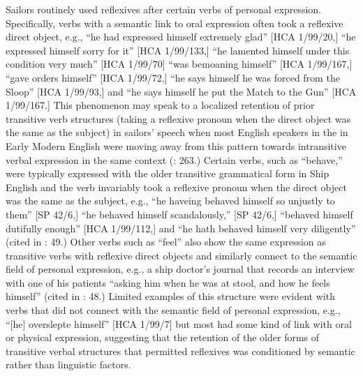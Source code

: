   Sailors routinely used reflexives after certain verbs of personal expression. Specifically, verbs with a semantic link to oral expression often took a reflexive direct object, e.g., “he had expressed himself extremely glad” [HCA 1/99/20,] “he expressed himself sorry for it” [HCA 1/99/133,] “he lamented himself under this condition very much” [HCA 1/99/70] “was bemoaning himself” [HCA 1/99/167,] “gave orders himself” [HCA 1/99/72,] “he says himself he was forced from the Sloop” [HCA 1/99/93,] and “he says himself he put the Match to the Gun” [HCA 1/99/167.] This phenomenon may speak to a localized retention of prior transitive verb structures (taking a reflexive pronoun when the direct object was the same as the subject) in sailors’ speech when most English speakers in the in Early Modern English were moving away from this pattern towards intransitive verbal expression in the same context (\citealt{MillwardHayes2012}: 263.) Certain verbs, such as “behave,” were typically expressed with the older transitive grammatical form in Ship English and the verb invariably took a reflexive pronoun when the direct object was the same as the subject, e.g., “he haveing behaved himself so unjustly to them” [SP 42/6,] “he behaved himself scandalously,” [SP 42/6,] “behaved himself dutifully enough” [HCA 1/99/112,] and “he hath behaved himself very diligently” (cited in \citealt{Brown2011}: 49.) Other verbs such as “feel” also show the same expression as transitive verbs with reflexive direct objects and similarly connect to the semantic field of personal expression, e.g., a ship doctor’s journal that records an interview with one of his patients “asking him when he was at stool, and how he feels himself” (cited in \citealt{Brown2011}: 48.) Limited examples of this structure were evident with verbs that did not connect with the semantic field of personal expression, e.g., “[he] overslepte himself” [HCA 1/99/7] but most had some kind of link with oral or physical expression, suggesting that the retention of the older forms of transitive verbal structures that permitted reflexives was conditioned by semantic rather than linguistic factors. 

